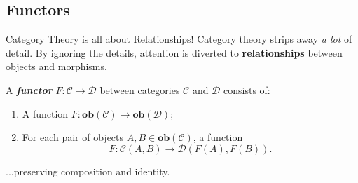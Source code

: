 \documentclass[10pt]{beamer}
\newcommand\newterm[2][]{\textbf{\itshape\color{blue!50!black}#2}}
\newcommand{\cat}[1]{\mathcal{#1}}      %
\newcommand{\ob}[1]{\mathbf{ob}(#1)}       %
\DeclareRobustCommand{\step}{\bigskip\noindent}
\begin{document}



\subsection{Functors}

\begin{frame}[fragile]{Category Theory is all about Relationships!}
  Category theory strips away \emph{a lot} of detail. \newline
  By ignoring the details, attention is diverted to
  \textbf{relationships} between objects and morphisms.

  \begin{definition}

    \step
    A \newterm{functor} $F : \cat{C} \to \cat{D}$ between categories $\cat{C}$ and $\cat{D}$
    consists of:
    \begin{enumerate}
      \item A function $F : \ob{\cat{C}} \to \ob{\cat{D}}$;
      \item For each pair of objects $A, B \in \ob{\cat{C}}$, a function
        \[
          F : \cat{C}(A,B) \to \cat{D}(F(A), F(B)).
        \]
    \end{enumerate}
    ...preserving composition and identity.
  \end{definition}
\end{frame}
\end{document}
